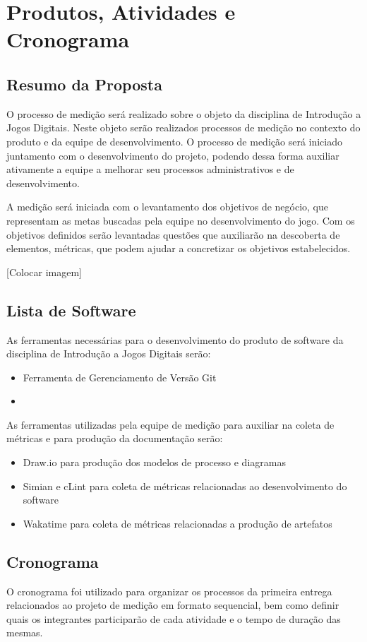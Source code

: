 \chapter{Produtos, Atividades e Cronograma}

\section{Resumo da Proposta}
	O processo de medição será realizado sobre o objeto da disciplina de Introdução a Jogos Digitais. Neste objeto serão realizados processos de medição no contexto do produto e da equipe de desenvolvimento. O processo de medição será iniciado juntamento com o desenvolvimento do projeto, podendo dessa forma auxiliar ativamente a equipe a melhorar seu processos administrativos e de desenvolvimento.
	
	A medição será iniciada com o levantamento dos objetivos de negócio, que representam as metas buscadas pela equipe no desenvolvimento do jogo. Com os objetivos definidos serão levantadas questões que auxiliarão na descoberta de elementos, métricas, que podem ajudar a concretizar os objetivos estabelecidos.
	
	[Colocar imagem]
	
\section{Lista de Software}
	As ferramentas necessárias para o desenvolvimento do produto de software da disciplina de Introdução a Jogos Digitais serão: 
	\begin{itemize}
		\item Ferramenta de Gerenciamento de Versão Git
		\item
	\end{itemize}
	
	As ferramentas utilizadas pela equipe de medição para auxiliar na coleta de métricas e para produção da documentação serão:
	
	\begin{itemize}
		\item Draw.io para produção dos modelos de processo e diagramas
		\item Simian e cLint para coleta de métricas relacionadas ao desenvolvimento do software
		\item Wakatime para coleta de métricas relacionadas a produção de artefatos
	\end{itemize}
	
\section{Cronograma}
	O cronograma foi utilizado para organizar os processos da primeira entrega relacionados ao projeto de medição em formato sequencial, bem como definir quais os integrantes participarão de cada atividade e o tempo de duração das mesmas.
	
